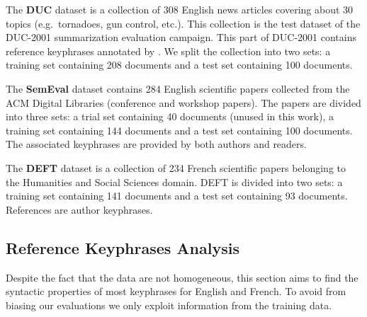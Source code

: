     The \textbf{DUC} dataset \cite{over2001duc} is a collection of 308 English
    news articles covering about 30 topics (e.g.~tornadoes, gun control, etc.).
    This collection is the test dataset of the DUC-2001 summarization evaluation
    campaign. This part of DUC-2001 contains reference keyphrases annotated by
    . We split the collection into two sets: a
    training set containing 208 documents and a test set containing 100
    documents.

    The \textbf{SemEval} dataset \cite{kim2010semeval} contains 284 English
    scientific papers collected from the ACM Digital Libraries (conference and
    workshop papers). The papers are divided into three sets: a trial set
    containing 40 documents (unused in this work), a training set containing 144
    documents and a test set containing 100 documents. The associated keyphrases
    are provided by both authors and readers.

    The \textbf{DEFT} dataset \cite{Paroubek2012deft} is a collection of 234
    French scientific papers belonging to the Humanities and Social Sciences
    domain. DEFT is divided into two sets: a training set containing 141
    documents and a test set containing 93 documents. References are author
    keyphrases.

  \subsection{Reference Keyphrases Analysis}
  \label{subsec:keyphrase_analysis}
    Despite the fact that the data are not homogeneous, this section aims to
    find the syntactic properties of most keyphrases for English and French. To
    avoid from biasing our evaluations we only exploit information from the
    training data.

